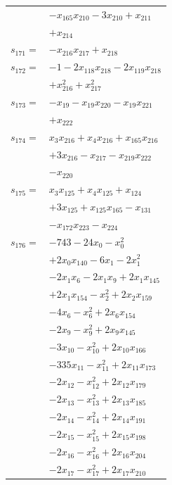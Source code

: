 \begin{longtable}{@{}r@{\;}l@{}}
 & \(\displaystyle -x_{165}x_{210} -3x_{210} +x_{211}\) \\
 & \(\displaystyle +x_{214}\) \\[3pt]
\(s_{171}=\) & \(\displaystyle -x_{216}x_{217} +x_{218}\) \\[3pt]
\(s_{172}=\) & \(\displaystyle -1 -2x_{118}x_{218} -2x_{119}x_{218}\) \\
 & \(\displaystyle +x_{216}^{2} +x_{217}^{2}\) \\[3pt]
\(s_{173}=\) & \(\displaystyle -x_{19} -x_{19}x_{220} -x_{19}x_{221}\) \\
 & \(\displaystyle +x_{222}\) \\[3pt]
\(s_{174}=\) & \(\displaystyle x_{3}x_{216} +x_{4}x_{216} +x_{165}x_{216}\) \\
 & \(\displaystyle +3x_{216} -x_{217} -x_{219}x_{222}\) \\
 & \(\displaystyle -x_{220}\) \\[3pt]
\(s_{175}=\) & \(\displaystyle x_{3}x_{125} +x_{4}x_{125} +x_{124}\) \\
 & \(\displaystyle +3x_{125} +x_{125}x_{165} -x_{131}\) \\
 & \(\displaystyle -x_{172}x_{223} -x_{224}\) \\[3pt]
\(s_{176}=\) & \(\displaystyle -743 -24x_{0} -x_{0}^{2}\) \\
 & \(\displaystyle +2x_{0}x_{140} -6x_{1} -2x_{1}^{2}\) \\
 & \(\displaystyle -2x_{1}x_{6} -2x_{1}x_{9} +2x_{1}x_{145}\) \\
 & \(\displaystyle +2x_{1}x_{154} -x_{2}^{2} +2x_{2}x_{159}\) \\
 & \(\displaystyle -4x_{6} -x_{6}^{2} +2x_{6}x_{154}\) \\
 & \(\displaystyle -2x_{9} -x_{9}^{2} +2x_{9}x_{145}\) \\
 & \(\displaystyle -3x_{10} -x_{10}^{2} +2x_{10}x_{166}\) \\
 & \(\displaystyle -335x_{11} -x_{11}^{2} +2x_{11}x_{173}\) \\
 & \(\displaystyle -2x_{12} -x_{12}^{2} +2x_{12}x_{179}\) \\
 & \(\displaystyle -2x_{13} -x_{13}^{2} +2x_{13}x_{185}\) \\
 & \(\displaystyle -2x_{14} -x_{14}^{2} +2x_{14}x_{191}\) \\
 & \(\displaystyle -2x_{15} -x_{15}^{2} +2x_{15}x_{198}\) \\
 & \(\displaystyle -2x_{16} -x_{16}^{2} +2x_{16}x_{204}\) \\
 & \(\displaystyle -2x_{17} -x_{17}^{2} +2x_{17}x_{210}\) \\

\end{longtable}
